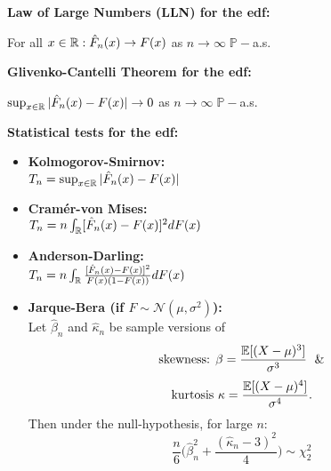 \textbf{Law of Large Numbers (LLN) for the edf:}

For all $x\in\mathbb{R}: \hat{F}_n(x)\rightarrow F(x)$ as $n\rightarrow \infty\; \mathbb{P}-$a.s.

\textbf{Glivenko-Cantelli Theorem for the edf:}

$\sup_{x\in\mathbb{R}} | \hat{F}_n(x) - F(x)|\rightarrow 0$ as $n\rightarrow \infty\; \mathbb{P}-$a.s.

\textbf{Statistical tests for the edf:}
\begin{itemize}
    \item \textbf{Kolmogorov-Smirnov:} \\
    $T_n=\sup_{x\in\mathbb{R}} |\hat F_n(x) - F(x)|$
    \item \textbf{Cramér-von Mises:} \\
    $T_n=n\int_{\mathbb{R}} [\hat F_n(x) - F(x)]^2 dF(x)$
    \item \textbf{Anderson-Darling:} \\
    $T_n=n\int_{\mathbb{R}} \frac{[\hat F_n(x) - F(x)]^2}{F(x)(1-F(x))} dF(x)$
    \item \textbf{Jarque-Bera (if $F\sim \mathcal{N}(\mu, \sigma^2)$):} \\
    Let $\hat \beta_n$ and $\hat \kappa_n$ be sample versions of
    \[\text{skewness: } \beta=\frac{\mathbb{E}[(X-\mu)^3]}{\sigma^3}\; \text{ \&}\]
    \[\text{kurtosis } \kappa=\frac{\mathbb{E}[(X-\mu)^4]}{\sigma^4}.\]
    Then under the null-hypothesis, for large $n$:
    \[\frac{n}{6}\big (\hat \beta_n ^ 2 + \frac{(\hat \kappa_n-3)^2}{4} \big)\sim\chi^2_2\]
\end{itemize}

